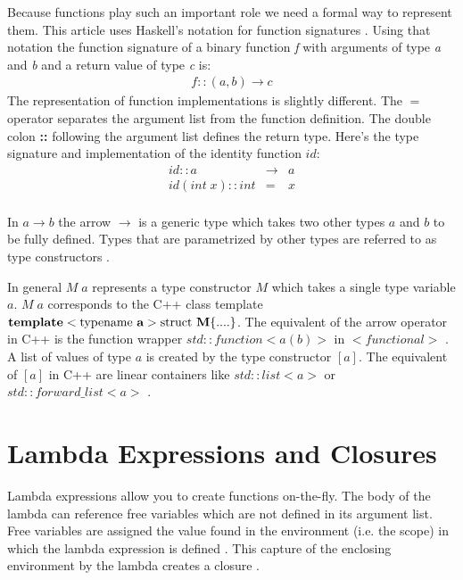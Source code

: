 \documentclass[12pt,fleqn]{article}
\begin{document}
Because functions play such an important role we need a formal way to represent them.
This article uses Haskell's notation for function signatures \cite{hutton}. 
Using that notation the function signature of
a binary function {\em f}  with arguments of type {\em a} and {\em b} and a return value of type {\em c} is:
\begin{eqnarray*}
                              f::(a,b) \rightarrow c
\end{eqnarray*}
The representation of function implementations is slightly different.
The $=$ operator separates the argument list from the function definition.  
The double colon {\bf ::} following the argument list defines the return type.
Here's the type signature and implementation of the identity function $id$:
\begin{eqnarray*}
id :: a &\rightarrow& a \\
id (int \; x)::int  &=& x  \\
\end{eqnarray*}

In $a \rightarrow b$ the arrow $\rightarrow$ is a generic type which takes two other types $a$ and $b$ to be fully defined.
Types that are parametrized by other types are referred to as type constructors \cite{lipovaca}.

In general $M\;a$ represents a type constructor $M$ which takes a single type variable $a$.
$M\;a$ corresponds to the C++ class template  
$ {\bf template}<\mbox{typename {\bf a}}> \mbox{struct {\bf M}} \{....\}$. 
The equivalent of the arrow operator in C++ is the function wrapper $std::function<a(b)>$ in $<functional>$ \cite{josuttis, std::function}. 
A list of values of type $a$ is created by the type constructor $[a]$.
The equivalent of $[a]$ in C++ are linear containers like $std::list<a>$ or $std::forward\_list<a>$ \cite{josuttis}.



\section*{Lambda Expressions and Closures}
Lambda expressions allow you to create functions on-the-fly. 
The body of the lambda can reference free variables which are not defined in its argument list. 
Free variables are assigned the value found in the environment (i.e. the scope) in which the lambda expression is defined \cite{field}. 
This capture of the enclosing environment by the lambda creates a closure \cite{field, scott}. 
\end{document}
